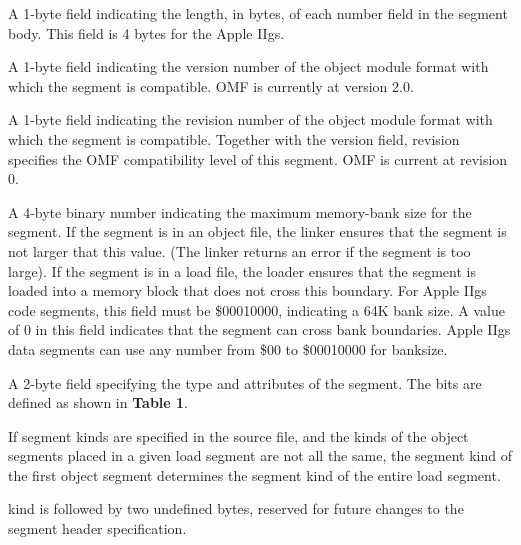  A 1-byte field indicating the length, in bytes, of each number
field in the segment body. This field is 4 bytes for the Apple IIgs.

 A 1-byte field indicating the version number of the object
module format with which the segment is compatible. OMF is currently at
version 2.0.

 A 1-byte field indicating the revision number of the object
module format with which the segment is compatible. Together with the
{\omf version} field, {\omf revision} specifies the OMF compatibility level
of this segment. OMF is current at revision 0.

 A 4-byte binary number indicating the maximum memory-bank
size for the segment. If the segment is in an object file, the linker ensures
that the segment is not larger that this value. (The linker returns an error
if the segment is too large). If the segment is in a load file, the loader
ensures that the segment is loaded into a memory block that does not cross
this boundary. For Apple IIgs code segments, this field must be
\$00010000, indicating a 64K bank size. A value of 0 in this field indicates
that the segment can cross bank boundaries. Apple IIgs data segments can use
any number from \$00 to \$00010000 for {\omf banksize.}

 A 2-byte field specifying the type and attributes of the
segment. The bits are defined as shown in {\bf Table 1}.

 If segment {\omf kind}s are specified in the
source file, and the {\omf kind}s of the object segments placed in a given
load segment are not all the same, the segment {\omf kind} of the first
object segment determines the segment {\omf kind} of the entire load segment.

\headhead
{\omf kind} is followed by two undefined bytes, reserved for future changes
to the segment header specification.

\bigskip


